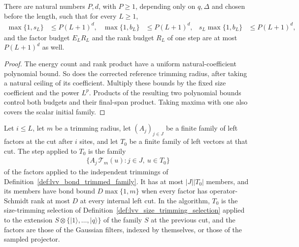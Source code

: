 \begin{lemma}
    \label{thm:lvv_successive_polynomial_budgets}
    \leanok
    There are natural numbers $P,d$, with $P\ge1$, depending only on $q,\Delta$
    and chosen before the length, such that for every $L\ge1$,
    \begin{align}
        \max\{1,s_L\}    & \le P(L+1)^d, &
        \max\{1,b_L\}    & \le P(L+1)^d, &
        s_L\max\{1,b_L\} & \le P(L+1)^d,
    \end{align}
    and the factor budget $E_LR_L$ and the rank budget $R_L$ of one step are
    at most $P(L+1)^d$ as well.
\end{lemma}
\begin{proof}
    \leanok
    The energy count and rank product have a uniform natural-coefficient
    polynomial bound. So does the corrected reference trimming radius, after
    taking a natural ceiling of its coefficient. Multiply these bounds by the
    fixed size coefficient and the power $L^p$. Products of the resulting two
    polynomial bounds control both budgets and their final-span product. Taking
    maxima with one also covers the scalar initial family.
\end{proof}

\begin{definition}
    \label{def:lvv_successive_step}
    \leanok
    Let $i\le L$, let $m$ be a trimming radius, let $(A_j)_{j\in J}$ be a
    finite family of left factors at the cut after $i$ sites, and let $T_0$
    be a finite family of left vectors at that cut. The step applied to
    $T_0$ is the family
    \begin{align}
        \{A_j\,\mathcal T_m(u) : j\in J,\ u\in T_0\}
    \end{align}
    of the factors applied to the independent trimmings of
    Definition~\ref{def:lvv_bond_trimmed_family}. It has at most $|J||T_0|$
    members, and its members have bond bound $D\max\{1,m\}$ when every
    factor has operator-Schmidt rank at most $D$ at every internal left cut.
    In the algorithm, $T_0$ is the size-trimming selection of
    Definition~\ref{def:lvv_size_trimming_selection} applied to the
    extension $S\otimes\{|1\rangle,\ldots,|q\rangle\}$ of the family
    $S$ at the previous cut, and the factors are those of the Gaussian
    filters, indexed by themselves, or those of the sampled projector.
\end{definition}

